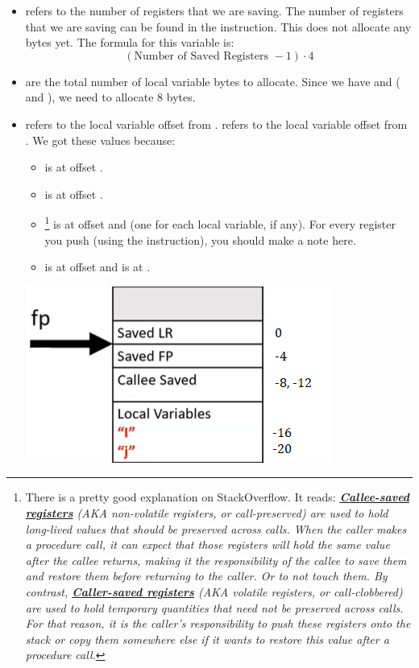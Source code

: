 \documentclass[letterpaper]{article}
\begin{document}
\begin{itemize}
    \item {} refers to the number of registers that we are saving. The number of registers that we are saving can be found in the  instruction. This does not allocate any bytes yet. The formula for this variable is:
    \[(\text{Number of Saved Registers } - 1) \cdot 4\]
    \item {} are the total number of local variable bytes to allocate. Since we have  and  ( and ), we need to allocate 8 bytes.
    \item {} refers to the local variable  offset from .  refers to the local variable  offset from . We got these values because:
    \begin{itemize}
        \item {} is at offset .
        \item {} is at offset .
        \item {}\footnote{There is a pretty good explanation on StackOverflow. It reads: \emph{\underline{\textbf{Callee-saved registers}} (AKA non-volatile registers, or call-preserved) are used to hold long-lived values that should be preserved across calls. When the caller makes a procedure call, it can expect that those registers will hold the same value after the callee returns, making it the responsibility of the callee to save them and restore them before returning to the caller. Or to not touch them. By contrast, \underline{\textbf{Caller-saved registers}} (AKA volatile registers, or call-clobbered) are used to hold temporary quantities that need not be preserved across calls. For that reason, it is the caller's responsibility to push these registers onto the stack or copy them somewhere else if it wants to restore this value after a procedure call.}} is at offset  and  (one for each local variable, if any). For every register you push (using the  instruction), you should make a note here. 
        \item {}  is at offset  and  is at .
    \end{itemize}
    \begin{center}
        \includegraphics[scale=0.8]{i3.PNG}

\end{center}
\end{itemize}
\end{document}
